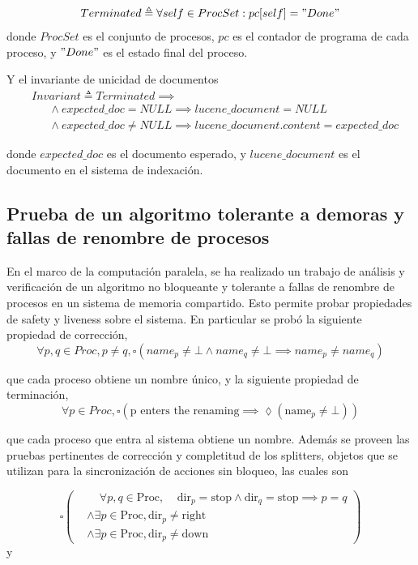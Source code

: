 \documentclass[runningheads]{llncs}
\begin{document}
\begin{equation}
    Terminated \triangleq \forall self \in ProcSet: pc[self] = "Done"
\end{equation}
donde $ProcSet$ es el conjunto de procesos, $pc$ es el contador de programa de cada proceso, y $"Done"$ es el estado final del proceso.

Y el invariante de unicidad de documentos
\[
\begin{aligned}
    &Invariant \triangleq Terminated \implies \\
    &\phantom{Inv} \land expected\_doc = NULL \implies lucene\_document = NULL \\ 
    &\phantom{Inv} \land expected\_doc \neq NULL \implies lucene\_document.content = expected\_doc
\end{aligned}
\]

donde $expected\_doc$ es el documento esperado, y $lucene\_document$ es el documento en el sistema de indexación.


\subsection{Prueba de un algoritmo tolerante a demoras y fallas de renombre de procesos}
En el marco de la computación paralela, se ha realizado un trabajo \cite{case_study} de análisis y verificación de un algoritmo no bloqueante y tolerante a fallas de renombre de procesos en un sistema de memoria compartido. Esto permite probar propiedades de safety y liveness sobre el sistema. En particular se probó la siguiente propiedad de corrección, 
\begin{equation}
    \forall p, q \in Proc, p \neq q, \square(name_p \neq \bot \land name_q \neq \bot \implies name_p \neq name_q)
\end{equation}

que cada proceso obtiene un nombre único, y la siguiente propiedad de terminación,
\begin{equation}
    \forall p \in Proc, \square(\text{p enters the renaming} \implies \lozenge (\text{name}_p \neq \bot))
\end{equation}

que cada proceso que entra al sistema obtiene un nombre.
Además se proveen las pruebas pertinentes de corrección y completitud de los splitters, objetos que se utilizan para la sincronización de acciones sin bloqueo,  las cuales son

\[
\square \left( \begin{aligned}
    &\phantom{\land} \forall p,q \in \text{Proc}, \phantom{\land} \text{dir}_p = \text{stop} \land \text{dir}_q = \text{stop} \implies p = q \\
    &\land \exists p \in \text{Proc}, \text{dir}_p \neq \text{right} \\
    &\land \exists p \in \text{Proc}, \text{dir}_p \neq \text{down}
\end{aligned} \right)
\]
y
\end{document}
